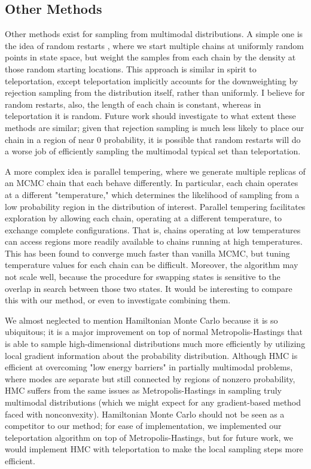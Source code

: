 \documentclass{article}
\begin{document}
\subsection{Other Methods}

Other methods exist for sampling from multimodal distributions. A simple one is
the idea of random restarts \cite{restarts}, where we start multiple chains at
uniformly random points in state space, but weight the samples from each chain
by the density at those random starting locations. This approach is similar in
spirit to teleportation, except teleportation implicitly accounts for the
downweighting by rejection sampling from the distribution itself, rather than
uniformly. I believe for random restarts, also, the length of each chain is
constant, whereas in teleportation it is random. Future work should investigate
to what extent these methods are similar; given that rejection sampling is much
less likely to place our chain in a region of near 0 probability, it is
possible that random restarts will do a worse job of efficiently sampling the
multimodal typical set than teleportation.

A more complex idea is parallel tempering, where we generate multiple replicas
of an MCMC chain that each behave differently. In particular, each chain
operates at a different "temperature," which determines the likelihood of
sampling from a low probability region in the distribution of interest.
Parallel tempering facilitates exploration by allowing each chain, operating at
a different temperature, to exchange complete configurations. That is, chains
operating at low temperatures can access regions more readily available to
chains running at high temperatures. This has been found to converge much
faster than vanilla MCMC, but tuning temperature values for each chain can be
difficult. Moreover, the algorithm may not scale well, because the procedure
for swapping states is sensitive to the overlap in search between those two
states. It would be interesting to compare this with our method, or even to
investigate combining them.

We almost neglected to mention Hamiltonian Monte Carlo \cite{hmc} because it is
so ubiquitous; it is a major improvement on top of normal Metropolis-Hastings
that is able to sample high-dimensional distributions much more efficiently by
utilizing local gradient information about the probability distribution.
Although HMC is efficient at overcoming "low energy barriers" in partially
multimodal problems, where modes are separate but still connected by regions of
nonzero probability, HMC suffers from the same issues as Metropolis-Hastings in
sampling truly multimodal distributions (which we might expect for any
gradient-based method faced with nonconvexity). Hamiltonian Monte Carlo should
not be seen as a competitor to our method; for ease of implementation, we
implemented our teleportation algorithm on top of Metropolis-Hastings, but for
future work, we would implement HMC with teleportation to make the local
sampling steps more efficient.
\end{document}
